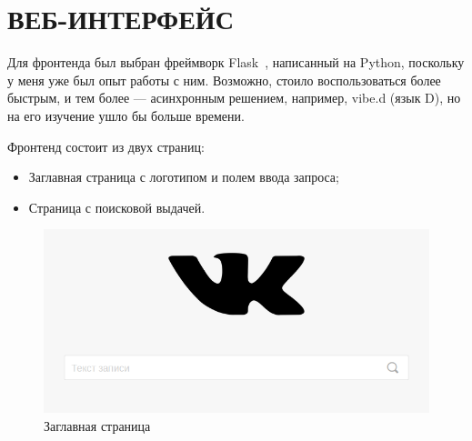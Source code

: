 \documentclass[14pt, a4paper]{extreport}
\title{}
\date{}
\begin{document}
\pagestyle{plain}

\renewcommand\abstractname{\MakeTextUppercase{Реферат}}



\newpage
\vspace*{-25mm}
\tableofcontents
\newpage


\chapter{\MakeTextUppercase{Веб-интерфейс}}
Для фронтенда был выбран фреймворк Flask~\cite{flask}, написанный на Python, поскольку у меня уже был опыт работы с ним. Возможно, стоило воспользоваться более быстрым, и тем более --- асинхронным решением, например, vibe.d (язык D), но на его изучение ушло бы больше времени.

Фронтенд состоит из двух страниц:
\begin{itemize}
  \item Заглавная страница с логотипом и полем ввода запроса;
  \item Страница с поисковой выдачей.
\end{itemize}

\begin{figure}[!htb]
  \centering
  \includegraphics[scale=0.55]{pics/frontend.png}
  \caption{Заглавная страница}
  \label{fig:frontend}
\end{figure}
\end{document}
